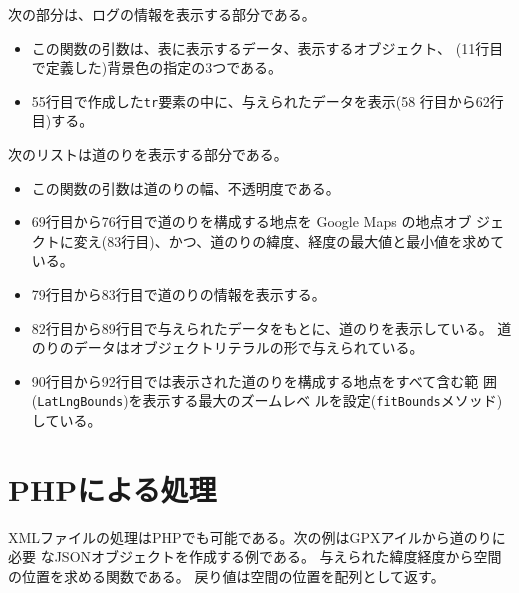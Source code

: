  次の部分は、ログの情報を表示する部分である。
 \begin{itemize}
	\item この関数の引数は、表に表示するデータ、表示するオブジェクト、
				(11行目で定義した)背景色の指定の3つである。
	\item 55行目で作成した\texttt{tr}要素の中に、与えられたデータを表示(58
				行目から62行目)する。
 \end{itemize}
 次のリストは道のりを表示する部分である。
 \begin{itemize}
	\item この関数の引数は道のりの幅、不透明度である。
	\item 69行目から76行目で道のりを構成する地点を Google Maps の地点オブ
				ジェクトに変え(83行目)、かつ、道のりの緯度、経度の最大値と最小値を求めて
				いる。
	\item 79行目から83行目で道のりの情報を表示する。
	\item 82行目から89行目で与えられたデータをもとに、道のりを表示している。
				道のりのデータはオブジェクトリテラルの形で与えられている。
	\item 90行目から92行目では表示された道のりを構成する地点をすべて含む範
				囲(\texttt{LatLngBounds})を表示する最大のズームレベ
				ルを設定(\texttt{fitBounds}メソッド)している。
 \end{itemize}
 \section{PHPによる処理}
 XMLファイルの処理はPHPでも可能である。次の例はGPXアイルから道のりに必要
 なJSONオブジェクトを作成する例である。
 与えられた緯度経度から空間の位置を求める関数である。
 戻り値は空間の位置を配列として返す。

